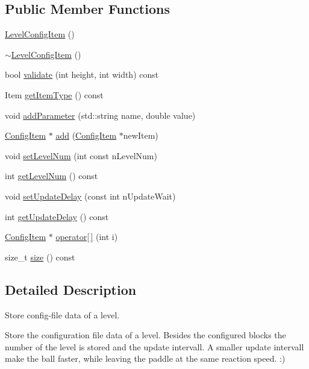 \subsection*{Public Member Functions}
\begin{DoxyCompactItemize}
\item 
\hyperlink{classLevelConfigItem_abefbac4a4cf846ab666d8836472b91b6}{Level\-Config\-Item} ()
\item 
\hyperlink{classLevelConfigItem_ae75692250e03ea40d77853e5af1dd36d}{$\sim$\-Level\-Config\-Item} ()
\item 
bool \hyperlink{classLevelConfigItem_af717103b0881d4512dbee6f3c509c568}{validate} (int height, int width) const 
\item 
Item \hyperlink{classLevelConfigItem_aed6d6c4ff654506d582732a77ec96056}{get\-Item\-Type} () const 
\item 
void \hyperlink{classLevelConfigItem_a7a8b3d45729b0351ee590f7fdc5a4e5f}{add\-Parameter} (std\-::string name, double value)
\item 
\hyperlink{classConfigItem}{Config\-Item} $\ast$ \hyperlink{classLevelConfigItem_a4e47772ef1d7d5062979424129f4d3e4}{add} (\hyperlink{classConfigItem}{Config\-Item} $\ast$new\-Item)
\item 
void \hyperlink{classLevelConfigItem_aafa487a690ee7bea2111969dc4369ed2}{set\-Level\-Num} (int const n\-Level\-Num)
\item 
int \hyperlink{classLevelConfigItem_a828bcca5a829b7cb1df12b20406ae982}{get\-Level\-Num} () const 
\item 
void \hyperlink{classLevelConfigItem_ae49bc07589a7117d4aaecf4bf4c2376c}{set\-Update\-Delay} (const int n\-Update\-Wait)
\item 
int \hyperlink{classLevelConfigItem_a9e2c29bf67193b6ed6da6bd0c532cf80}{get\-Update\-Delay} () const 
\item 
\hyperlink{classConfigItem}{Config\-Item} $\ast$ \hyperlink{classLevelConfigItem_ab41db3f785b4210fb9a681379fdde0d9}{operator\mbox{[}$\,$\mbox{]}} (int i)
\item 
size\-\_\-t \hyperlink{classLevelConfigItem_a3b928feaf14e2e2e2e145ef0ffac566c}{size} () const 
\end{DoxyCompactItemize}


\subsection{Detailed Description}
Store config-\/file data of a level. 

Store the configuration file data of a level. Besides the configured blocks the number of the level is stored and the update intervall. A smaller update intervall make the ball faster, while leaving the paddle at the same reaction speed. \-:) 

